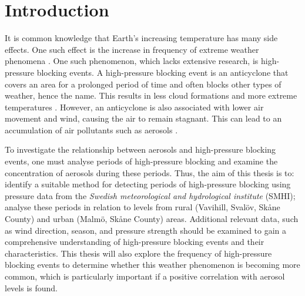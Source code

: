 \section{Introduction}
It is common knowledge that Earth's increasing temperature has many side effects. One such effect is the increase in frequency of extreme weather phenomena \cite{mitchellExtremeEventsDue2006}. One such phenomenon, which lacks extensive research, is high-pressure blocking events. A high-pressure blocking event is an anticyclone that covers an area for a prolonged period of time and often blocks other types of weather, hence the name. This results in less cloud formations and more extreme temperatures \cite{lupoAtmosphericBlockingEvents2020}. However, an anticyclone is also associated with lower air movement and wind, causing the air to remain stagnant. This can lead to an accumulation of air pollutants such as aerosols \cite{caiImpactBlockingStructure2020}.

To investigate the relationship between aerosols and high-pressure blocking events, one must analyse periods of high-pressure blocking and examine the concentration of aerosols during these periods. Thus, the aim of this thesis is to: identify a suitable method for detecting periods of high-pressure blocking using pressure data from the \textit{Swedish meteorological and hydrological institute} (SMHI); analyse these periods in relation to \PM levels from rural (Vavihill, Svalöv, Skåne County) and urban (Malmö, Skåne County) areas. Additional relevant data, such as wind direction, season, and pressure strength should be examined to gain a comprehensive understanding of high-pressure blocking events and their characteristics. This thesis will also explore the frequency of high-pressure blocking events to determine whether this weather phenomenon is becoming more common, which is particularly important if a positive correlation with aerosol levels is found. 
